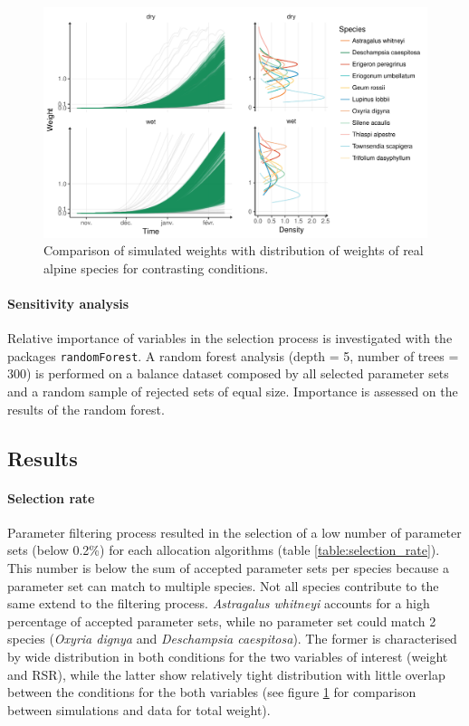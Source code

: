 \begin{figure}\label{fig:comparison_BM}
\includegraphics[width = \textwidth]{./2_PP/Figures/weight_full_sim.pdf}
\caption{Comparison of simulated weights with distribution of weights of real alpine species for contrasting conditions.}
\end{figure}

\paragraph{Sensitivity analysis}
Relative importance of variables in the selection process is investigated with the packages \texttt{randomForest}. A random forest analysis (depth = 5, number of trees = 300) is performed on a balance dataset composed by all selected parameter sets and a random sample of rejected sets of equal size. Importance is assessed on the results of the random forest.

\subsection{Results}

\paragraph{Selection rate}
Parameter filtering process resulted in the selection of a low number of parameter sets (below 0.2\%) for each allocation algorithms (table \ref{table:selection_rate}). This number is below the sum of accepted parameter sets per species because a parameter set can match to multiple species. Not all species contribute to the same extend to the filtering process. \textit{Astragalus whitneyi} accounts for a high percentage of accepted parameter sets, while no parameter set could match 2 species (\textit{Oxyria dignya} and \textit{Deschampsia caespitosa}). The former is characterised by wide distribution in both conditions for the two variables of interest (weight and RSR), while the latter show relatively tight distribution with little overlap between the conditions for the both variables (see figure \ref{fig:comparison_BM} for comparison between simulations and data for total weight).

